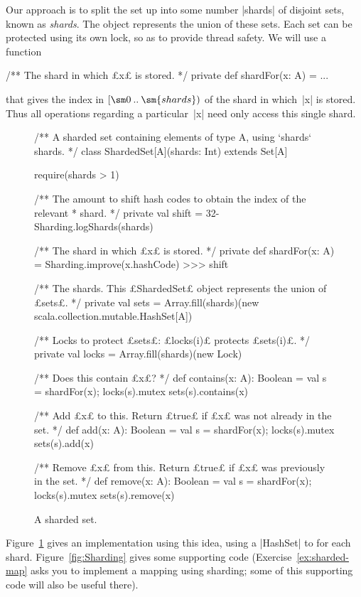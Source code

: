 Our approach is to split the set up into some number |shards| of disjoint
sets, known as \emph{shards}.  The object represents the union of these sets.
Each set can be protected using its own lock, so as to provide thread safety.
We will use a function
%
\begin{scala}
  /** The shard in which £x£ is stored. */ 
  private def shardFor(x: A) = ...
\end{scala}
%
that gives the index in $\interval{\sm 0}{\sm{shards}}$ of the shard in
which~|x| is stored.  Thus all operations regarding a particular~|x| need only
access this single shard.  


\begin{figure}
\begin{scala}
/** A sharded set containing elements of type A, using `shards` shards. */
class ShardedSet[A](shards: Int) extends Set[A]{
  require(shards > 1)

  /** The amount to shift hash codes to obtain the index of the relevant
    * shard. */
  private val shift = 32-Sharding.logShards(shards)

  /** The shard in which £x£ is stored. */ 
  private def shardFor(x: A) = Sharding.improve(x.hashCode) >>> shift

  /** The shards.  This £ShardedSet£ object represents the union of £sets£. */ 
  private val sets = Array.fill(shards)(new scala.collection.mutable.HashSet[A])

  /** Locks to protect £sets£: £locks(i)£ protects £sets(i)£. */
  private val locks = Array.fill(shards)(new Lock)

  /** Does this contain £x£? */
  def contains(x: A): Boolean = {
    val s = shardFor(x); locks(s).mutex{ sets(s).contains(x) }
  }

  /** Add £x£ to this.  Return £true£ if £x£ was not already in the set. */
  def add(x: A): Boolean = {
    val s = shardFor(x); locks(s).mutex{ sets(s).add(x) }
  }

  /** Remove £x£ from this.  Return £true£ if £x£ was previously in the set. */
  def remove(x: A): Boolean = {
    val s = shardFor(x); locks(s).mutex{ sets(s).remove(x) }
  }
}
\end{scala}
\caption{A sharded set.}
\label{fig:ShardedSet}
\end{figure}


Figure~\ref{fig:ShardedSet} gives an implementation using this idea, using a
|HashSet| to for each shard.  Figure~\ref{fig:Sharding} gives some supporting
code (Exercise~\ref{ex:sharded-map} asks you to implement a mapping using
sharding; some of this supporting code will also be useful there).

